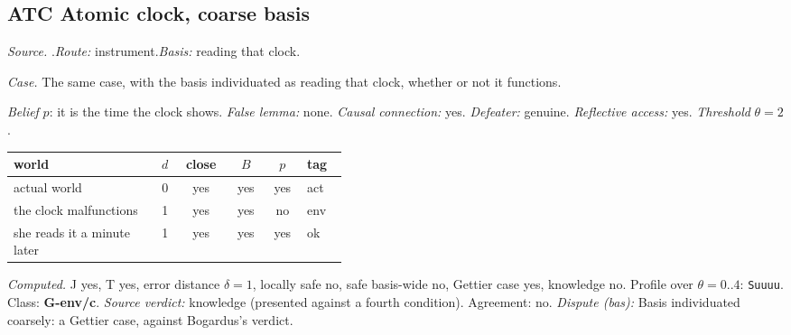 \subsection*{ATC \enspace Atomic clock, coarse basis}
\noindent\textit{Source.} \citet{Bogardus2014}.\quad \textit{Route:} instrument.\quad \textit{Basis:} reading that clock.\par
\noindent\textit{Case.} The same case, with the basis individuated as reading that clock, whether or not it functions.\par
\noindent\textit{Belief} $p$: it is the time the clock shows.
 \textit{False lemma:} none. \textit{Causal connection:} yes. \textit{Defeater:} genuine. \textit{Reflective access:} yes. \textit{Threshold} $\theta = 2$.\par
\begin{center}\begin{tabular}{@{}p{0.43\linewidth}rcccl@{}}
world & $d$ & close & $B$ & $p$ & tag \\ \midrule
actual world & 0 & yes & yes & yes & act \\
the clock malfunctions & 1 & yes & yes & no & env \\
she reads it a minute later & 1 & yes & yes & yes & ok \\
\end{tabular}\end{center}
\noindent\textit{Computed.} J yes, T yes, error distance $\delta = 1$, locally safe no, safe basis-wide no, Gettier case yes, knowledge no. Profile over $\theta = 0..4$: \texttt{Suuuu}. Class: \textbf{G-env/c}.
 \textit{Source verdict:} knowledge (presented against a fourth condition). Agreement: no.
 \textit{Dispute (bas):} Basis individuated coarsely: a Gettier case, against Bogardus's verdict.
\par\medskip
{}
